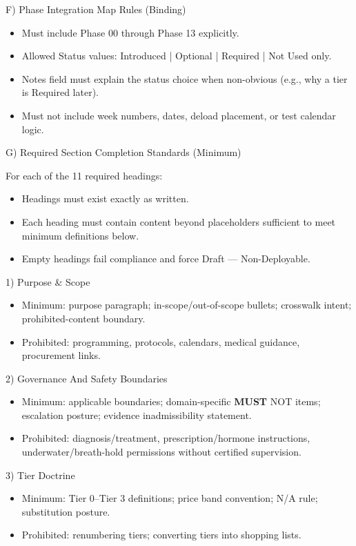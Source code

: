 \documentclass[10pt]{article}
\begin{document}
F) Phase Integration Map Rules (Binding)

\begin{itemize}
\item Must include Phase 00 through Phase 13 explicitly.
\item Allowed Status values: Introduced | Optional | Required | Not Used only.
\item Notes field must explain the status choice when non-obvious (e.g., why a tier is Required later).
\item Must not include week numbers, dates, deload placement, or test calendar logic.
\end{itemize}

G) Required Section Completion Standards (Minimum)

For each of the 11 required headings:

\begin{itemize}
\item Headings must exist exactly as written.
\item Each heading must contain content beyond placeholders sufficient to meet minimum definitions below.
\item Empty headings fail compliance and force Draft — Non-Deployable.
\end{itemize}

1) Purpose \& Scope

\begin{itemize}
\item Minimum: purpose paragraph; in-scope/out-of-scope bullets; crosswalk intent; prohibited-content boundary.
\item Prohibited: programming, protocols, calendars, medical guidance, procurement links.
\end{itemize}

2) Governance And Safety Boundaries

\begin{itemize}
\item Minimum: applicable boundaries; domain-specific \textbf{MUST} NOT items; escalation posture; evidence inadmissibility statement.
\item Prohibited: diagnosis/treatment, prescription/hormone instructions, underwater/breath-hold permissions without certified supervision.
\end{itemize}

3) Tier Doctrine

\begin{itemize}
\item Minimum: Tier 0–Tier 3 definitions; price band convention; N/A rule; substitution posture.
\item Prohibited: renumbering tiers; converting tiers into shopping lists.
\end{itemize}
\end{document}
